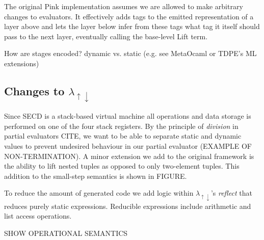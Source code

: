 \documentclass{article}
\theoremstyle{definition}
\newcommand{\mslang}{$\lambda_{\uparrow\downarrow}$}
\begin{document}
The original Pink implementation assumes we are allowed to make arbitrary changes to evaluators. It effectively adds tags to the emitted representation of a layer above and lets the layer below infer from these tags what tag it itself should pass to the next layer, eventually calling the base-level Lift term.

How are stages encoded? dynamic vs. static (e.g. see MetaOcaml or TDPE's ML extensions)

\subsection{Changes to \texorpdfstring{\mslang}{Lg}}
Since SECD is a stack-based virtual machine all operations and data storage is performed on one of the four stack registers. By the principle of \textit{division} in partial evaluators CITE, we want to be able to separate static and dynamic values to prevent undesired behaviour in our partial evaluator (EXAMPLE OF NON-TERMINATION). A minor extension we add to the original framework is the ability to lift nested tuples as opposed to only two-element tuples. This addition to the small-step semantics is shown in FIGURE.

To reduce the amount of generated code we add logic within \mslang's \textit{reflect} that reduces purely static expressions. Reducible expressions include arithmetic and list access operations.

SHOW OPERATIONAL SEMANTICS

\end{document}
